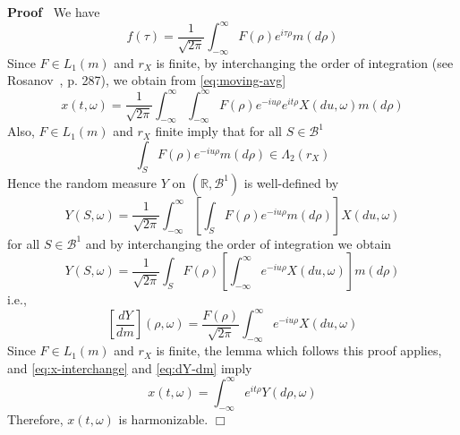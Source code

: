 \documentclass{article}
\newenvironment{proof}{\noindent\textbf{Proof\ }}{\hspace*{\fill}$\Box$\medskip}
\begin{document}
\begin{proof}
  We have
  \begin{equation}
    f (\tau) = \frac{1}{\sqrt{2 \pi}}  \int_{- \infty}^{\infty} F (\rho) e^{i
    \tau \rho} m (d \rho) \label{eq:f-fourier}
  \end{equation}
  Since $F \in L_1 (m)$ and $r_X$ is finite, by interchanging the order of
  integration (see Rosanov~{\cite{rosanov1959}}, p. 287), we obtain from
  \eqref{eq:moving-avg}
  \begin{equation}
    x (t, \omega) = \frac{1}{\sqrt{2 \pi}}  \int_{- \infty}^{\infty} \int_{-
    \infty}^{\infty} F (\rho) e^{- iu \rho} e^{it \rho} X (du, \omega) m (d
    \rho) \label{eq:x-interchange}
  \end{equation}
  Also, $F \in L_1 (m)$ and $r_X$ finite imply that for all $S \in
  \mathscr{B}^1$
  \begin{equation}
    \int_S F (\rho) e^{- iu \rho} m (d \rho) \in \Lambda_2 (r_X)
    \label{eq:F-Lambda}
  \end{equation}
  Hence the random measure $Y$ on $(\mathbb{R}, \mathscr{B}^1)$ is
  well-defined by
  \begin{equation}
    Y (S, \omega) = \frac{1}{\sqrt{2 \pi}}  \int_{- \infty}^{\infty} \left[
    \int_S F (\rho) e^{- iu \rho} m (d \rho) \right] X (du, \omega)
    \label{eq:Y-define}
  \end{equation}
  for all $S \in \mathscr{B}^1$ and by interchanging the order of integration
  we obtain
  \begin{equation}
    Y (S, \omega) = \frac{1}{\sqrt{2 \pi}}  \int_S F (\rho) \left[ \int_{-
    \infty}^{\infty} e^{- iu \rho} X (du, \omega) \right] m (d \rho)
    \label{eq:Y-interchange}
  \end{equation}
  i.e.,
  \begin{equation}
    \left[ \frac{dY}{dm} \right] (\rho, \omega) = \frac{F (\rho)}{\sqrt{2
    \pi}}  \int_{- \infty}^{\infty} e^{- iu \rho} X (du, \omega)
    \label{eq:dY-dm}
  \end{equation}
  Since $F \in L_1 (m)$ and $r_X$ is finite, the lemma which follows this
  proof applies, and \eqref{eq:x-interchange} and \eqref{eq:dY-dm} imply
  \begin{equation}
    x (t, \omega) = \int_{- \infty}^{\infty} e^{it \rho} Y (d \rho, \omega)
    \label{eq:x-harmonize}
  \end{equation}
  Therefore, $x (t, \omega)$ is harmonizable.
\end{proof}
\end{document}
